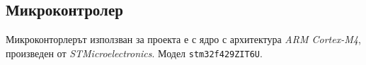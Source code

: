 \subsection{Микроконтролер}

Микроконторлерът използван за проекта е с ядро с архитектура \textit{ARM Cortex-M4}, произведен от \textit{STMicroelectronics}.
Модел \texttt{stm32f429ZIT6U}.

